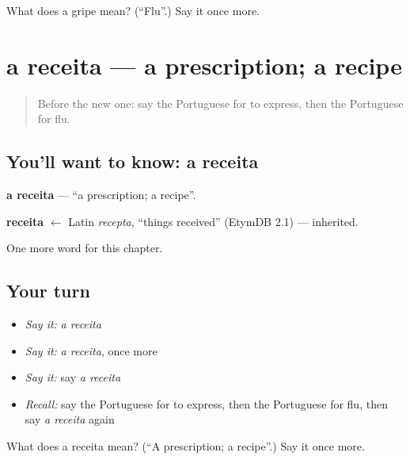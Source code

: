 \begin{tcolorbox}[breakable,colback=teal!4,colframe=teal!35!black,title={Before you move on}]
What does a gripe mean? (\textquotedblleft{}Flu\textquotedblright{}.) Say it once more.
\end{tcolorbox}
\section[a receita]{a receita — a prescription; a recipe}

\label{lesson:PT-C210-receita}



\begin{quote}
Before the new one: say the Portuguese for to express, then the Portuguese for flu.
\end{quote}

\subsection*{You'll want to know: a receita}
\textbf{a receita} — \textquotedblleft{}a prescription; a recipe\textquotedblright{}.

\begin{cousinweb}
\textbf{receita} $\leftarrow$ Latin \emph{recepta}, \textquotedblleft{}things received\textquotedblright{} (EtymDB 2.1) — inherited.
\end{cousinweb}

\begin{grammarlens}[title={What you've built}]
One more word for this chapter.
\end{grammarlens}

\subsection*{Your turn}
\begin{itemize}
\raggedright
  \item \emph{Say it:} \emph{a receita}
  \item \emph{Say it:} \emph{a receita}, once more
  \item \emph{Say it:} say \emph{a receita}
  \item \emph{Recall:} say the Portuguese for to express, then the Portuguese for flu, then say \emph{a receita} again
\end{itemize}

\begin{tcolorbox}[breakable,colback=teal!4,colframe=teal!35!black,title={Before you move on}]
What does a receita mean? (\textquotedblleft{}A prescription; a recipe\textquotedblright{}.) Say it once more.
\end{tcolorbox}
